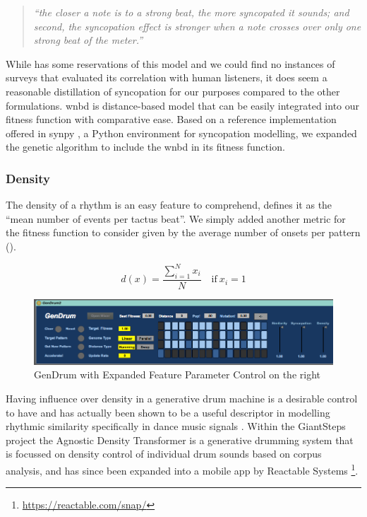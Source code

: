 {{\blockcquote[]{Gomez2007}{\textit{``the closer a note is to a strong beat, the more syncopated it sounds; and second, the syncopation effect is stronger when a note crosses over only one strong beat of the meter.''}}

While \cite{Song2013} has some reservations of this model and we could find no instances of surveys that evaluated its correlation with human listeners, it does seem a reasonable distillation of syncopation for our purposes compared to the other formulations.  \acrshort{wnbd} is distance-based model that can be easily integrated into our fitness function with comparative ease.  Based on a reference implementation offered in synpy \citep{Song2015}, a Python environment for syncopation modelling, we expanded the genetic algorithm to include the \acrshort{wnbd} in its fitness function.

\subsubsection{Density}

The density of a rhythm is an easy feature to comprehend, \citep{Wiggins2012a} defines it as the ``mean number of events per tactus beat''. We simply added another metric for the fitness function to consider given by the average number of onsets per pattern ().

\begin{equation}
\label{eq:density}
	d(x)=\frac{\sum_{i=1}^{N}x_i}{N} \quad \text{if}\ x_i=1
\end{equation}

\begin{figure}
	\begin{center}
		\includegraphics[width=1.0\textwidth]{ch03_symbolic/figures/gendrum2.png}
	\end{center}
	\caption[GenDrum with Expanded Feature Parameter Control]{GenDrum with Expanded Feature Parameter Control on the right}
	\label{fig:gendrum2}
\end{figure}

Having influence over density in a generative drum machine is a desirable control to have and  has actually been shown to be a useful descriptor in modelling rhythmic similarity specifically in dance music signals \citep{Panteli2014a}. Within the GiantSteps project the Agnostic Density Transformer \citep{Jorda2016} is a generative drumming system that is focussed on density control of individual drum sounds based on corpus analysis, and has since been expanded into a mobile app by Reactable Systems \footnote{\url{https://reactable.com/snap/}}.

}}
